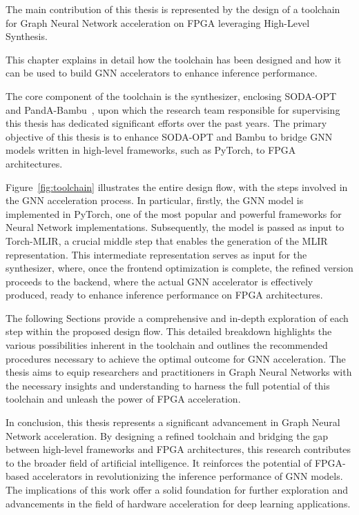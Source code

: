 The main contribution of this thesis is represented by the design of a toolchain for Graph Neural Network acceleration on FPGA leveraging High-Level Synthesis.

This chapter explains in detail how the toolchain has been designed and how it can be used to build GNN accelerators to enhance inference performance.

The core component of the toolchain is the synthesizer, enclosing SODA-OPT~\cite{9786533} and PandA-Bambu~\cite{9586110}, upon which the research team responsible for supervising this thesis has dedicated significant efforts over the past years.
The primary objective of this thesis is to enhance SODA-OPT and Bambu to bridge GNN models written in high-level frameworks, such as PyTorch, to FPGA architectures.

Figure~\ref{fig:toolchain} illustrates the entire design flow, with the steps involved in the GNN acceleration process.
In particular, firstly, the GNN model is implemented in PyTorch, one of the most popular and powerful frameworks for Neural Network implementations.
Subsequently, the model is passed as input to Torch-MLIR, a crucial middle step that enables the generation of the MLIR representation.
This intermediate representation serves as input for the synthesizer, where, once the frontend optimization is complete, the refined version proceeds to the backend, where the actual GNN accelerator is effectively produced, ready to enhance inference performance on FPGA architectures.

The following Sections provide a comprehensive and in-depth exploration of each step within the proposed design flow.
This detailed breakdown highlights the various possibilities inherent in the toolchain and outlines the recommended procedures necessary to achieve the optimal outcome for GNN acceleration.
The thesis aims to equip researchers and practitioners in Graph Neural Networks with the necessary insights and understanding to harness the full potential of this toolchain and unleash the power of FPGA acceleration.

In conclusion, this thesis represents a significant advancement in Graph Neural Network acceleration.
By designing a refined toolchain and bridging the gap between high-level frameworks and FPGA architectures, this research contributes to the broader field of artificial intelligence.
It reinforces the potential of FPGA-based accelerators in revolutionizing the inference performance of GNN models.
The implications of this work offer a solid foundation for further exploration and advancements in the field of hardware acceleration for deep learning applications.

